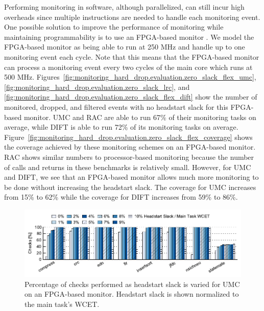 Performing monitoring in software, although parallelized, can still incur high
overheads since multiple instructions are needed to handle each monitoring
event. One possible solution to improve the performance of monitoring while
maintaining programmability is to use an FPGA-based monitor
\cite{flexcore-micro10}. We model the FPGA-based monitor as being able to
run at 250 MHz and handle up to one monitoring event each cycle. Note that this
means that the FPGA-based monitor can process a monitoring event every two
cycles of the main core which runs at 500 MHz.
Figures~\ref{fig:monitoring_hard_drop.evaluation.zero_slack_flex_umc},
\ref{fig:monitoring_hard_drop.evaluation.zero_slack_lrc}, and
\ref{fig:monitoring_hard_drop.evaluation.zero_slack_flex_dift} show the
number of monitored, dropped, and filtered events with no headstart slack for
this FPGA-based monitor. UMC and RAC are able to run 67\% of their monitoring
tasks on average, while DIFT is able to run 72\% of its monitoring tasks on
average.
Figure~\ref{fig:monitoring_hard_drop.evaluation.zero_slack_flex_coverage} shows
the coverage achieved by these monitoring schemes on an FPGA-based monitor. RAC
shows similar numbers to processor-based monitoring because the number of calls
and returns in these benchmarks is relatively small. However, for UMC and DIFT,
we see that an FPGA-based monitor allows much more monitoring to be done
without increasing the headstart slack. The coverage for UMC increases from
15\% to 62\% while the coverage for DIFT increases from 59\% to 86\%.

\begin{figure}
  \begin{center}
    \includegraphics{monitoring_hard_drop/data/flex_umc_sweep.pdf}
    \caption{Percentage of checks performed as headstart slack is varied for
    UMC on an FPGA-based monitor. Headstart slack is shown normalized to the
    main task's WCET.}
    \label{fig:monitoring_hard_drop.evaluation.flex_umc_sweep}
  \end{center}
\end{figure}

